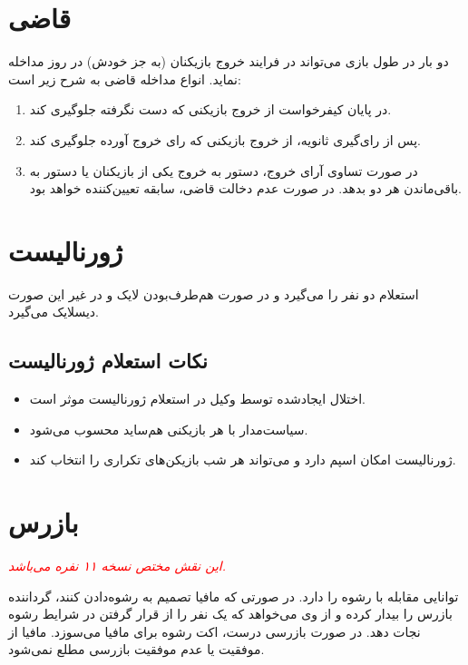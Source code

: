 \documentclass[12pt]{extarticle}
\begin{document}
\section{قاضی}
دو بار در طول بازی می‌تواند در فرایند خروج بازیکنان (به جز خودش) در روز مداخله نماید. انواع مداخله قاضی به شرح زیر است:
\begin{enumerate}[label=(\roman*)]
	\item در پایان کیفرخواست از خروج بازیکنی که دست نگرفته جلوگیری کند.
	\item پس از رای‌گیری ثانویه، از خروج بازیکنی که رای خروج آورده جلوگیری کند.
	\item در صورت تساوی آرای خروج، دستور به خروج یکی از بازیکنان یا دستور به
	      باقی‌ماندن هر دو بدهد. در صورت عدم دخالت قاضی، سابقه تعیین‌کننده خواهد بود.
\end{enumerate}

\section{ژورنالیست}
استعلام دو نفر را می‌گیرد و در صورت هم‌طرف‌بودن لایک و در غیر این صورت دیسلایک
می‌گیرد.

\subsection{نکات استعلام ژورنالیست}
\begin{itemize}
	\item اختلال ایجادشده توسط وکیل در استعلام ژورنالیست موثر است.
	\item سیاست‌مدار با هر بازیکنی هم‌ساید محسوب می‌شود.
	\item ژورنالیست امکان اسپم دارد و می‌تواند هر شب بازیکن‌های تکراری را
	      انتخاب کند.
\end{itemize}

\section{بازرس}
\textit{\textcolor{red}{
		این نقش مختص نسخه ۱۱ نفره می‌باشد.
	}}

توانایی مقابله با رشوه را دارد. در صورتی که مافیا تصمیم به رشوه‌‌دادن کنند، گرداننده بازرس را بیدار کرده و از وی می‌خواهد که یک نفر را از قرار گرفتن در شرایط رشوه نجات دهد. در صورت بازرسی درست، اکت رشوه برای مافیا می‌سوزد. مافیا از موفقیت یا عدم موفقیت بازرسی مطلع نمی‌شود.

\clearpage
{}
\end{document}
